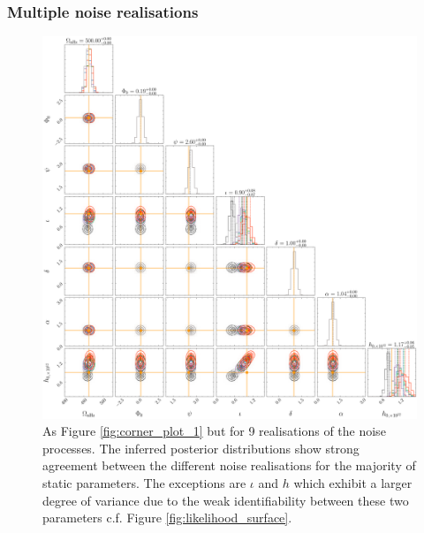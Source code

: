 \documentclass[fleqn,usenatbib,useAMS]{mnras}
\begin{document}
\subsubsection{Multiple noise realisations} \label{sec:multiple_noise}
\begin{figure}
	\includegraphics[width=\textwidth, height =\textwidth]{images/stacked_GW_plot_1000}
	\caption{As Figure \ref{fig:corner_plot_1} but for 9 realisations of the noise processes. The inferred posterior distributions show strong agreement between the different noise realisations for the majority of static parameters. The exceptions are $\iota$ and $h$ which exhibit a larger degree of variance due to the weak identifiability between these two parameters c.f. Figure \ref{fig:likelihood_surface}.} 
	\label{fig:corner_plot_2}
\end{figure}
\end{document}
